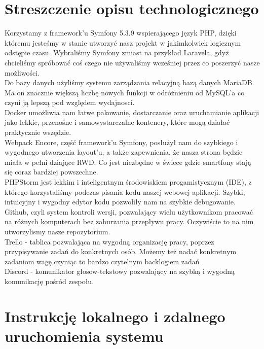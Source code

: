 \documentclass{article}
\begin{document}
\section{Streszczenie opisu technologicznego}
Korzystamy z framework'u Symfony 5.3.9 wspierającego język PHP, dzięki któremu jesteśmy w stanie utworzyć nasz projekt w jakimkolwiek logicznym odstępie czasu. Wybraliśmy Symfony zmiast na przykład Laravela, gdyż chcieliśmy spróbować coś czego nie używaliśmy wcześniej przez co poszerzyć nasze możliwości.\\
Do bazy danych użyliśmy systemu zarządzania relacyjną bazą danych MariaDB. Ma on znacznie większą liczbę nowych funkcji w odróżnieniu od MySQL'a co czyni ją lepszą pod względem wydajnosci.\\
Docker umożliwia nam łatwe pakowanie, dostarczanie oraz uruchamianie aplikacji jako lekkie, przenośne i samowystarczalne kontenery, które mogą działać praktycznie wszędzie.\\
Webpack Encore, część framework'u Symfony, posłużył nam do szybkiego i wygodnego utworzenia layout'u, a także zapewnienia, że nasza strona będzie miała w pełni dziające RWD. Co jest niezbędne w świece gdzie smartfony stają się coraz bardziej powszechne.\\
PHPStorm jest lekkim i inteligentnym środowiskiem progamistycznym (IDE),  z którego korzystaliśmy podczas  pisania kodu naszej webowej aplikacji. Szybki, intuicyjny i wygodny edytor kodu pozwoliły nam na szybkie debugowanie.\\
Github, czyli system kontroli wersji, pozwalający wielu użytkownikom pracować na różnych komputerach bez zaburzania przepływu pracy. Oczywiście to na nim utworzylismy nasze repozytorium.\\
Trello - tablica pozwalająca na wygodną organizację pracy, poprzez przypisywanie zadań do konkretnych osób. Możemy też nadać konkretnym zadaniom wagę czyniąc to bardzo czytelnym backlogiem zadań\\
Discord - komunikator głosow-tekstowy pozwalający na szybką i wygodną komunikację pośród zespołu.
\section{Instrukcję lokalnego i zdalnego uruchomienia systemu}
\end{document}
